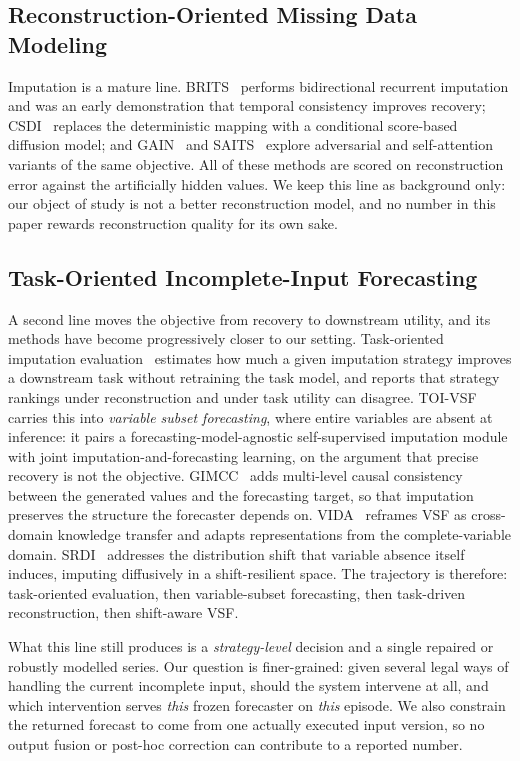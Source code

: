 \documentclass{article}
\begin{document}
\subsection{Reconstruction-Oriented Missing Data Modeling}
Imputation is a mature line. BRITS~\citep{cao2018brits} performs bidirectional recurrent
imputation and was an early demonstration that temporal consistency improves recovery;
CSDI~\citep{tashiro2021csdi} replaces the deterministic mapping with a conditional
score-based diffusion model; and GAIN~\citep{yoon2018gain} and SAITS~\citep{du2023saits}
explore adversarial and self-attention variants of the same objective. All of these methods
are scored on reconstruction error against the artificially hidden values. We keep this line
as background only: our object of study is not a better reconstruction model, and no number
in this paper rewards reconstruction quality for its own sake.

\subsection{Task-Oriented Incomplete-Input Forecasting}
\label{sec:related-taskoriented}
A second line moves the objective from recovery to downstream utility, and its methods have
become progressively closer to our setting. Task-oriented imputation
evaluation~\citep{wang2024taskoriented} estimates how much a given imputation strategy
improves a downstream task without retraining the task model, and reports that strategy
rankings under reconstruction and under task utility can disagree. TOI-VSF~\citep{hao2025toivsf}
carries this into \emph{variable subset forecasting}, where entire variables are absent at
inference: it pairs a forecasting-model-agnostic self-supervised imputation module with joint
imputation-and-forecasting learning, on the argument that precise recovery is not the
objective. GIMCC~\citep{hao2025gimcc} adds multi-level causal consistency between the
generated values and the forecasting target, so that imputation preserves the structure the
forecaster depends on. VIDA~\citep{liang2025vida} reframes VSF as cross-domain knowledge
transfer and adapts representations from the complete-variable domain.
SRDI~\citep{xu2026srdi} addresses the distribution shift that variable absence itself induces,
imputing diffusively in a shift-resilient space. The trajectory is therefore: task-oriented
evaluation, then variable-subset forecasting, then task-driven reconstruction, then
shift-aware VSF.

What this line still produces is a \emph{strategy-level} decision and a single repaired or
robustly modelled series. Our question is finer-grained: given several legal ways of handling
the current incomplete input, should the system intervene at all, and which intervention
serves \emph{this} frozen forecaster on \emph{this} episode. We also constrain the returned
forecast to come from one actually executed input version, so no output fusion or post-hoc
correction can contribute to a reported number.
\end{document}

